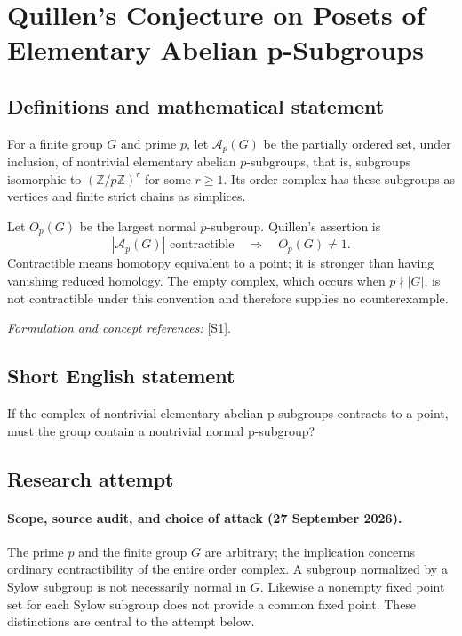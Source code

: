 \documentclass[11pt]{article}
\begin{document}
\section*{\texorpdfstring{Quillen's Conjecture on Posets of Elementary Abelian p-Subgroups}{Quillen's Conjecture on Posets of Elementary Abelian p-Subgroups}}\label{497}
\subsection{Definitions and mathematical statement}
For a finite group $G$ and prime $p$, let $\mathcal A_p(G)$ be the partially ordered set, under inclusion, of nontrivial elementary abelian $p$-subgroups, that is, subgroups isomorphic to $({\mathbb{Z}}/p{\mathbb{Z}})^r$ for some $r\ge1$. Its order complex has these subgroups as vertices and finite strict chains as simplices.

Let $O_p(G)$ be the largest normal $p$-subgroup. Quillen's assertion is
\[
 |\mathcal A_p(G)|\text{ contractible}
                   \quad\Longrightarrow\quad O_p(G)\ne1.
\]
Contractible means homotopy equivalent to a point; it is stronger than having vanishing reduced homology. The empty complex, which occurs when $p\nmid|G|$, is not contractible under this convention and therefore supplies no counterexample.
\par\smallskip\textit{Formulation and concept references:} \href{https://eprints.lancs.ac.uk/id/eprint/158837/1/dm_rev9.pdf}{[S1]}.

\subsection{Short English statement}
If the complex of nontrivial elementary abelian p-subgroups contracts to a point, must the group contain a nontrivial normal p-subgroup?
\subsection{Research attempt}

\paragraph{Scope, source audit, and choice of attack (27 September 2026).}
The prime $p$ and the finite group $G$ are arbitrary; the implication concerns
ordinary contractibility of the entire order complex. A subgroup normalized by
a Sylow subgroup is not necessarily normal in $G$. Likewise a nonempty fixed
point set for each Sylow subgroup does not provide a common fixed point.
These distinctions are central to the attempt below.
\end{document}
